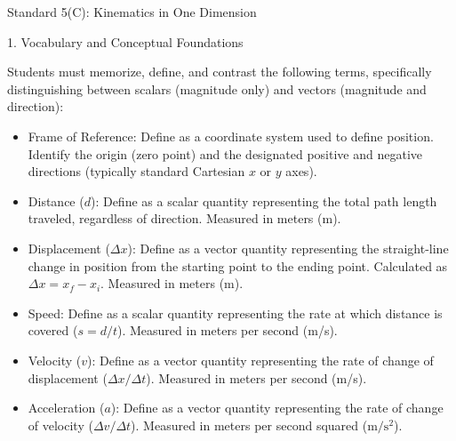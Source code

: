 \documentclass[]{article}
\begin{document}



\clearpage




 Standard 5(C): Kinematics in One Dimension

1. Vocabulary and Conceptual Foundations

Students must memorize, define, and contrast the following terms, specifically distinguishing between scalars (magnitude only) and vectors (magnitude and direction):

\begin{itemize}[itemsep=0pt,topsep=0pt]
    \item  Frame of Reference: Define as a coordinate system used to define position. Identify the origin (zero point) and the designated positive and negative directions (typically standard Cartesian $x$ or $y$ axes).
    \item Distance ($d$): Define as a scalar quantity representing the total path length traveled, regardless of direction. Measured in meters (m).
    \item Displacement ($\Delta x$): Define as a vector quantity representing the straight-line change in position from the starting point to the ending point. Calculated as $\Delta x = x_f - x_i$. Measured in meters (m).
    \item Speed: Define as a scalar quantity representing the rate at which distance is covered ($s = d/t$). Measured in meters per second (m/s).
    \item Velocity ($v$): Define as a vector quantity representing the rate of change of displacement ($\Delta x / \Delta t$). Measured in meters per second (m/s).
    \item Acceleration ($a$): Define as a vector quantity representing the rate of change of velocity ($\Delta v / \Delta t$). Measured in meters per second squared ($\mathrm{m/s^2}$).
\end{itemize}
\end{document}
